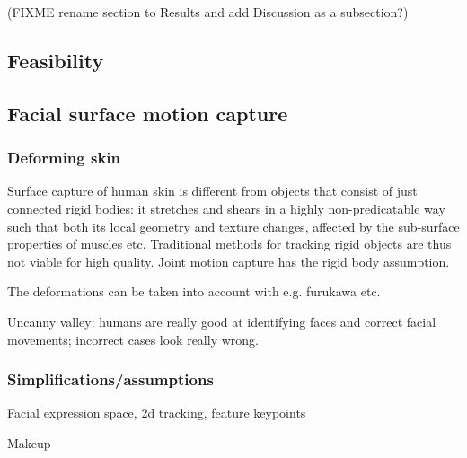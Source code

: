 (FIXME rename section to Results and add Discussion as a subsection?)






%
%
%



\subsection{Feasibility}

\subsection{Facial surface motion capture} %

\subsubsection{Deforming skin}


Surface capture of human skin is different from objects that consist of just connected rigid bodies: it stretches and shears in a highly non-predicatable way such that both its local geometry and texture changes, affected by the sub-surface properties of muscles etc.
Traditional methods for tracking rigid objects are thus not viable for high quality.
Joint motion capture has the rigid body assumption.

The deformations can be taken into account with e.g. furukawa etc.

Uncanny valley: humans are really good at identifying faces and correct facial movements; incorrect cases look really wrong.

\subsubsection{Simplifications/assumptions}

Facial expression space, 2d tracking, feature keypoints

Makeup

